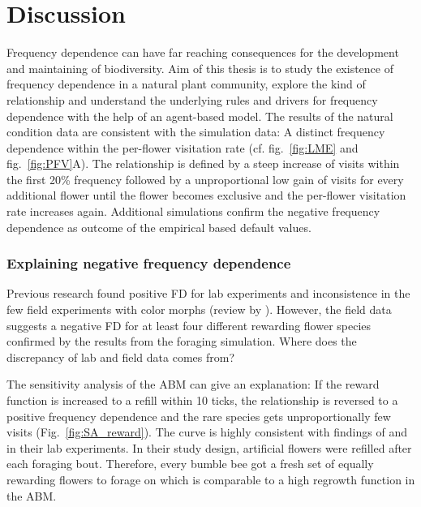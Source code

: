 \label{ch:discussion}
\section{Discussion}

Frequency dependence can have far reaching consequences for the development and maintaining of biodiversity. Aim of this thesis is to study the existence of frequency dependence in a natural plant community, explore the kind of relationship and understand the underlying rules and drivers for frequency dependence with the help of an agent-based model.
The results of the natural condition data are consistent with the simulation data: A distinct frequency dependence within the per-flower visitation rate (cf. fig.~\ref{fig:LME} and fig.~\ref{fig:PFV}A). The relationship is defined by a steep increase of visits within the first 20\% frequency followed by a unproportional low gain of visits for every additional flower until the flower becomes exclusive and the per-flower visitation rate increases again. Additional simulations confirm the negative frequency dependence as outcome of the empirical based default values.

\subsubsection*{Explaining negative frequency dependence}

Previous research found positive FD for lab experiments and inconsistence in the few field experiments with color morphs (review by \citealt{smithson2001pollinator}). However, the field data suggests a negative FD for at least four different rewarding flower species confirmed by the results from the foraging simulation. Where does the discrepancy of lab and field data comes from? 

The sensitivity analysis of the ABM can give an explanation: If the reward function is increased to a refill within 10 ticks, the relationship is reversed to a positive frequency dependence and the rare species gets unproportionally few visits (Fig.~\ref{fig:SA_reward}). The curve is highly consistent with findings of  \cite{smithson1997density} and \cite{smithson1996frequency} in their lab experiments. In their study design, artificial flowers were refilled after each foraging bout. Therefore, every bumble bee got a fresh set of equally rewarding flowers to forage on which is comparable to a high regrowth function in the ABM.

